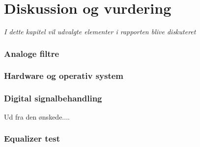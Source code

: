 \chapter{Diskussion og vurdering}\label{kap:diskussion}
\emph{I dette kapitel vil udvalgte elementer i rapporten blive diskuteret}

\subsection{Analoge filtre}

\subsection{Hardware og operativ system}

\subsection{Digital signalbehandling}
Ud fra den ønskede....
\subsection{Equalizer test}

